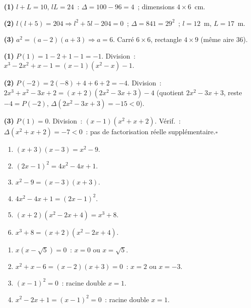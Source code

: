 
\textbf{(1)} $l+L=10$, $lL=24$~: $\Delta=100-96=4$~; dimensions $4\times6$~cm.

\textbf{(2)} $l(l+5)=204\Rightarrow l^2+5l-204=0$~; $\Delta=841=29^2$~;
$l=12$~m, $L=17$~m.

\textbf{(3)} $a^2=(a-2)(a+3)\Rightarrow a=6$.
Carr\'e $6\times6$, rectangle $4\times9$ (m\^eme aire $36$).\checkmark


\textbf{(1)} $P(1)=1-2+1-1=-1$. Division~: $x^3-2x^2+x-1=(x-1)(x^2-x)-1$.

\textbf{(2)} $P(-2)=2(-8)+4+6+2=-4$. Division~: $2x^3+x^2-3x+2=(x+2)(2x^2-3x+3)-4$ (quotient $2x^2-3x+3$, reste $-4=P(-2)$, $\Delta(2x^2-3x+3)=-15<0$).

\textbf{(3)} $P(1)=0$. Division~: $(x-1)(x^2+x+2)$.
V\'erif.~: $\Delta(x^2+x+2)=-7<0$~: pas de factorisation r\'eelle suppl\'ementaire.\hfill$\square$


\begin{enumerate}
  \item $(x+3)(x-3)=x^2-9$.
  \item $(2x-1)^2=4x^2-4x+1$.
  \item $x^2-9=(x-3)(x+3)$.
  \item $4x^2-4x+1=(2x-1)^2$.
  \item $(x+2)(x^2-2x+4)=x^3+8$.
  \item $x^3+8=(x+2)(x^2-2x+4)$.
\end{enumerate}


\begin{enumerate}
  \item $x(x-\sqrt{5})=0$~: $x=0$ ou $x=\sqrt{5}$.
  \item $x^2+x-6=(x-2)(x+3)=0$~: $x=2$ ou $x=-3$.
  \item $(x-1)^2=0$~: racine double $x=1$.
  \item $x^2-2x+1=(x-1)^2=0$~: racine double $x=1$.
\end{enumerate}

